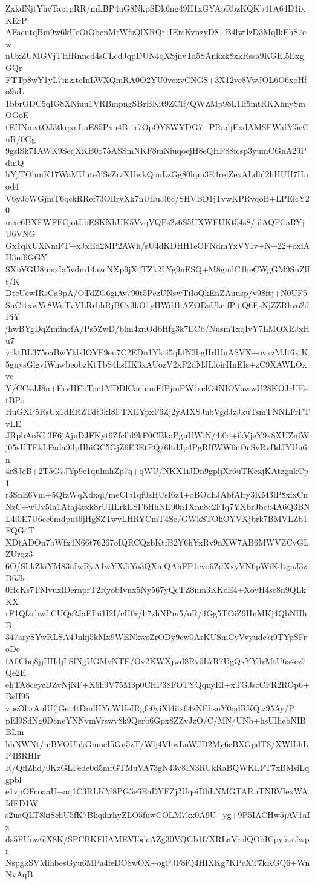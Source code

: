 ZxkdNjtYhcTaprpRR/mLBP4uG8NkpSDk6ng49H1xGYApRbzKQKb41A64D1ixKErP
AFaeutqBm9w6kUeOiQbcnMtWfsQlXRQr1IErsKvnzyD8+B4lwilzD3MqIkEhS7cw
nUxZUMGVjTHfRnncd4sCLcdJqpDUN4qXSjnvTa5SAnkxk8xkRssa9KGEl5ExgGQr
FTTp8wY1yL7inzitcInLWXQmRA0O2YU0vcxvCNGS+3X12vc8VwJOL6O6xoHfo9uL
1bbrODC5qIG8XNiuu1VRBmpngSBrBKit9ZCIf/QWZMp98L1If5mtRKXhnySmOGoE
tEHNmvtOJ3tkqxnLuE85Pxn4B+r7OpOY8WYDG7+PRadjExdAMSFWafM5cCnR/0Gg
9gslSk71AWK9SeqXKB0o75ASSmNKF8mNiuqoejH8eQHF88fcsp3yumCGnA29PdmQ
hYjTOhmK17WaMUuteYSsZrzXUwkQouLzGg80lqm3E4rejZexALdhl2hHUH7Hnod4
V6yJoWGjmT6qckRRef73OIlryXk7nUfIuJl6c/SHVBD1jTvwKPRvqoB+LPEicY20
mxe6BXFWFFCjotLbESKNhUK5VvqVQPs2z6S5UXWFUKt54s8/iilAQFCaRYjU6VNG
Gx1qKUXNmFT+xJxEd2MP2AWh/sU4dKDHH1eOFNdmYxVYIv+N+22+oxiAH3nf6GGY
SXnVGU8msxIa5vdm14azcNXp9jX4TZk2LYg9nESQ+M8gndC4heCWgGM9SnZlIt/K
DtcUewIRsCa9pA/OTdZG6giAv790t5PezUNswTiIoQkEnZAuusp/v98ftj+N0UF5
SnCttxwVc8WuTvVLRrhhRjBCv3kO1yHWd1hAZODsUkcifP+Q6EsNjZZRhvo2dPiY
jhwBYgDqZmiincfA/Ps5ZwD/blm4znOdbHfg3k7ECb/NusmTxqIvY7LMOXEJxHu7
vrktBL375oaBwYklxlOYF9eu7C2EDn1Ykti5qLfN3bgHrlUuASVX+ovxzMJt6xiK
5guysGlgvfWnwbeobzKtTbS4hsHK3xAUozV2xP2dMJLloirHnEIs+zC9XAWLOxvc
Y/CC4JJ8n+ErvHFbToc1MDDlCaelmnFfPjmPW1selO4NIOVuwwU28KOJrUEstBPo
HuGXP5RsUx1dERZTdt0kI8FTXEYpxF6Zj2yAIXSJnbVgdJzJkuTsmTNNLFrFTvLE
JRpbAoKL3F6jAjuDJFKyt6Zfclbl9kF0CBkaPguUWiN/4i0o+ikVjeY9x8XUZniW
j05sUTEkLFada9ilpHbiGC5GjZ6E3EtPQ/6ltdJp4PgRIfWW6nOcSvRvBdJYUu6n
4rSJeB+2T5G7JYp9e1qulmhZp7q+qWU/NKX1iJDn9gpljXr6uTKcxjKAtzgnkCp1
r3SnE6Vm+5QfzWqXdxql/meClb1qf0zHUsI6z4+oBOdhJAbfAlry3KM3lP8xixCn
NzC+wUv5Ia1Ataj4txk8rUIILrkESFbHhNE90n1Xnu8c2FIq7YXbrJbcb4A6Q3BN
L4i0E7U6ce6mdput6jHgSZTwvLHRYCmT4Se/GWkSTOkOYVXjbrk7BMVLZb1FQG4T
XDtADOn7bWfx4N66t76267oIQRCQzbKtfB2Y6hYxRv9nXW7AB6MWVZCvGLZUrqz3
6O/SLkZkiYM83nIwRyA1wYXJiYo3QXmQAhFP1cvo6ZdXxyVN6pWiKdtgaJ3zD6Jk
0HcKs7TMvuxlDernprT2RyobIvnx5Ny567yQcTZ8nm3KKcE4+XovH4sc8n9QLkKX
rF1QfzrbwLCUQs2JaEIhi1I2I/cH0r/h7zhNPm5/oR/4Gg5TOiZ9HnMKj4QbNHhB
347arySYwRLSA4Jnkj5kMx9WENkwsZrODy9cw0ArKUSmCyVvyudc7i9TYpSFroDe
fA0Cbq8jjHHdjLSlNgUGMvNTE/Ov2KWXjwd8Rv0L7R7UgQxYYdrMtU6s4cz7Qe2E
ehTA8ceyeDZvNjNF+X6h9V75M3p0CHP38FOTYQqnyEI+xTGJscCFR2ROp6+BsH95
vpsOltrAulUfjGet4tDmlHYuWUeIRgfc0yiXl4its64zNEbsnY0qdRKQiz95Ay/P
pEl9SdNg0DcneYNNvmVrswv8k9Qerb6Gpx8ZZvJzO/C/MN/UNb+hsUIhebNIBBLm
hhNWNt/mBVOUhkGmneI5Gn5zT/Wlj4VhwLnWJD2My6cBXGpdT8/XWfLhLP4BRHIr
R/QflZhd/0KzGLFede0d5mfGTMuVA73gN43v8IN3RUkRaBQWKLFT7xBMsiLqgpbl
e1vpOFcoaaU+aq1C3RLKM8PG3e6EaDYFZj2UqeiDhLNMGTARnTNRVIexWAIdFD1W
s2uaQLT8kiSchU5fK7BkqihrhyZLO5fuwCOLM7kx0A9U+yg+9P5IACHw5jAV1aIz
ds5FUow6lX8K/SPCBKFlIAMEVI5deAZg30VQGb1f/XRLaVrolQObICpyfastlwpr
NspgkSVMihbesGyu6MPa4feDO8wOX+ogPJF8iQ4HIXKg7KPcXT7kKGQ6+WnNvAqB
